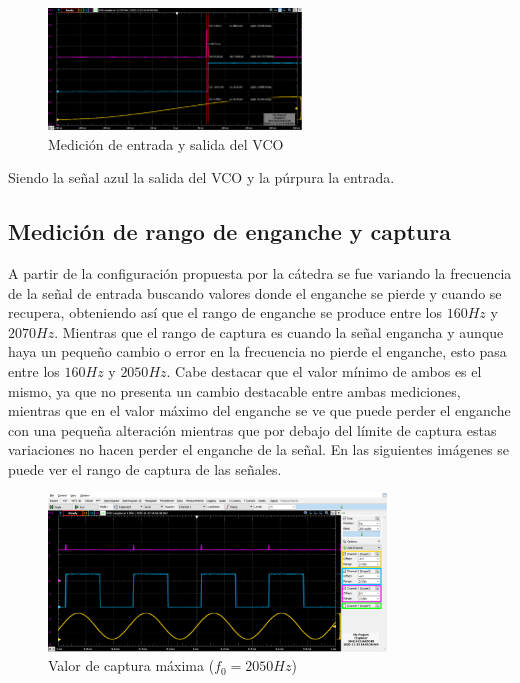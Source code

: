 \begin{figure}[H]
	\includegraphics[width= 0.6\textwidth]{../1. PLL/Imagenes/KVCO.png}
	\centering
	\caption{Medición de entrada y salida del VCO}
	\label{fig:KVCO}
\end{figure}

Siendo la señal azul la salida del VCO y la púrpura la entrada.

\subsection{Medición de rango de enganche y captura}

A partir de la configuración propuesta por la cátedra se fue variando la frecuencia de la señal de entrada buscando valores donde el enganche se pierde y cuando se recupera, obteniendo así que el rango de enganche se produce entre los $160Hz$ y $2070Hz$. Mientras que el rango de captura es cuando la señal engancha y aunque haya un pequeño cambio o error en la frecuencia no pierde el enganche, esto pasa entre los $160Hz$ y $2050Hz$. Cabe destacar que el valor mínimo de ambos es el mismo, ya que no presenta un cambio destacable entre ambas mediciones, mientras que en el valor máximo del enganche se ve que puede perder el enganche con una pequeña alteración mientras que por debajo del límite de captura estas variaciones no hacen perder el enganche de la señal.
En las siguientes imágenes se puede ver el rango de captura de las señales.

\begin{figure}[H]
	\includegraphics[width= 0.8\textwidth]{../1. PLL/Imagenes/CapturaMax.png}
	\centering
	\caption{Valor de captura máxima ($f_0=2050Hz$)}
	\label{fig:CapMax}
\end{figure}

